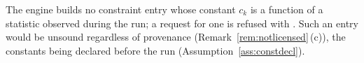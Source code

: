 
\begin{requirement}\label{req:declared-constants-only}
The engine builds no constraint entry whose constant $c_k$ is a function of a
statistic observed during the run; a request for one is refused with
. Such an entry would be unsound regardless of
provenance (Remark~\ref{rem:notlicensed}\,(c)), the constants being declared
before the run (Assumption~\ref{ass:constdecl}).
\end{requirement}
